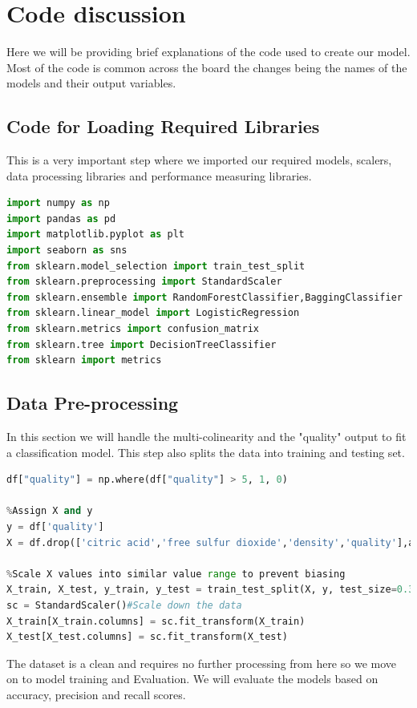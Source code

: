 \documentclass{article}
\begin{document}
\section{Code discussion}
Here we will be providing brief explanations of the code used to create our model. Most of the code is common across the board the changes being the names of the models and their output variables.
\subsection{Code for Loading Required Libraries}
This is a very important step where we imported our required models, scalers, data processing libraries and performance measuring libraries.
\begin{lstlisting}[language=Python, caption=Libraries used]
import numpy as np
import pandas as pd
import matplotlib.pyplot as plt
import seaborn as sns
from sklearn.model_selection import train_test_split 
from sklearn.preprocessing import StandardScaler
from sklearn.ensemble import RandomForestClassifier,BaggingClassifier
from sklearn.linear_model import LogisticRegression
from sklearn.metrics import confusion_matrix
from sklearn.tree import DecisionTreeClassifier
from sklearn import metrics
\end{lstlisting}

\subsection{Data Pre-processing}
In this section we will handle the multi-colinearity and the "quality" output to fit a classification model. This step also splits the data into training and testing set.
\begin{lstlisting}[language=Python]
%Change the quality column to 0,i.e, bad wine and 1,i.e,good wine.
df["quality"] = np.where(df["quality"] > 5, 1, 0)

%Assign X and y
y = df['quality']
X = df.drop(['citric acid','free sulfur dioxide','density','quality'],axis = 1)

%Scale X values into similar value range to prevent biasing
X_train, X_test, y_train, y_test = train_test_split(X, y, test_size=0.3, random_state=23)
sc = StandardScaler()#Scale down the data
X_train[X_train.columns] = sc.fit_transform(X_train)
X_test[X_test.columns] = sc.fit_transform(X_test)
\end{lstlisting}
The dataset is a clean and requires no further processing from here so we move on to model training and Evaluation.
We will evaluate the models based on accuracy, precision and recall scores.
\end{document}
